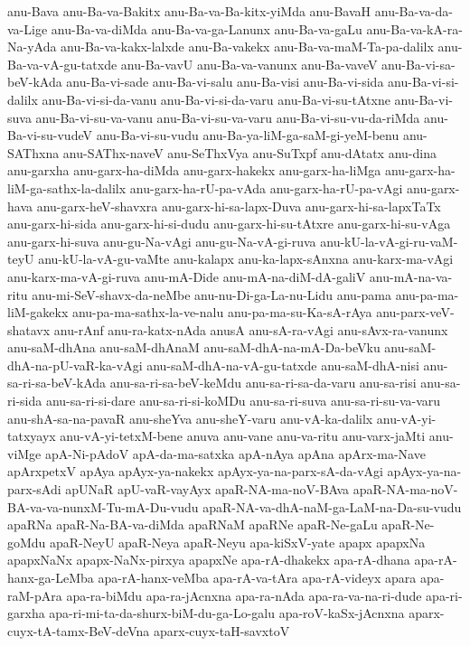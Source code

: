{anu-Bava
anu-Ba-va-Bakitx
anu-Ba-va-Ba-kitx-yiMda
anu-BavaH
anu-Ba-va-da-va-Lige
anu-Ba-va-diMda
anu-Ba-va-ga-Lanunx
anu-Ba-va-gaLu
anu-Ba-va-kA-ra-Na-yAda
anu-Ba-va-kakx-lalxde
anu-Ba-vakekx
anu-Ba-va-maM-Ta-pa-dalilx
anu-Ba-va-vA-gu-tatxde
anu-Ba-vavU
anu-Ba-va-vanunx
anu-Ba-vaveV
anu-Ba-vi-sa-beV-kAda
anu-Ba-vi-sade
anu-Ba-vi-salu
anu-Ba-visi
anu-Ba-vi-sida
anu-Ba-vi-si-dalilx
anu-Ba-vi-si-da-vanu
anu-Ba-vi-si-da-varu
anu-Ba-vi-su-tAtxne
anu-Ba-vi-suva
anu-Ba-vi-su-va-vanu
anu-Ba-vi-su-va-varu
anu-Ba-vi-su-vu-da-riMda
anu-Ba-vi-su-vudeV
anu-Ba-vi-su-vudu
anu-Ba-ya-liM-ga-saM-gi-yeM-benu
anu-SAThxna
anu-SAThx-naveV
anu-SeThxVya
anu-SuTxpf
anu-dAtatx
anu-dina
anu-garxha
anu-garx-ha-diMda
anu-garx-hakekx
anu-garx-ha-liMga
anu-garx-ha-liM-ga-sathx-la-dalilx
anu-garx-ha-rU-pa-vAda
anu-garx-ha-rU-pa-vAgi
anu-garx-hava
anu-garx-heV-shavxra
anu-garx-hi-sa-lapx-Duva
anu-garx-hi-sa-lapxTaTx
anu-garx-hi-sida
anu-garx-hi-si-dudu
anu-garx-hi-su-tAtxre
anu-garx-hi-su-vAga
anu-garx-hi-suva
anu-gu-Na-vAgi
anu-gu-Na-vA-gi-ruva
anu-kU-la-vA-gi-ru-vaM-teyU
anu-kU-la-vA-gu-vaMte
anu-kalapx
anu-ka-lapx-sAnxna
anu-karx-ma-vAgi
anu-karx-ma-vA-gi-ruva
anu-mA-Dide
anu-mA-na-diM-dA-galiV
anu-mA-na-va-ritu
anu-mi-SeV-shavx-da-neMbe
anu-nu-Di-ga-La-nu-Lidu
anu-pama
anu-pa-ma-liM-gakekx
anu-pa-ma-sathx-la-ve-nalu
anu-pa-ma-su-Ka-sA-rAya
anu-parx-veV-shatavx
anu-rAnf
anu-ra-katx-nAda
anusA
anu-sA-ra-vAgi
anu-sAvx-ra-vanunx
anu-saM-dhAna
anu-saM-dhAnaM
anu-saM-dhA-na-mA-Da-beVku
anu-saM-dhA-na-pU-vaR-ka-vAgi
anu-saM-dhA-na-vA-gu-tatxde
anu-saM-dhA-nisi
anu-sa-ri-sa-beV-kAda
anu-sa-ri-sa-beV-keMdu
anu-sa-ri-sa-da-varu
anu-sa-risi
anu-sa-ri-sida
anu-sa-ri-si-dare
anu-sa-ri-si-koMDu
anu-sa-ri-suva
anu-sa-ri-su-va-varu
anu-shA-sa-na-pavaR
anu-sheYva
anu-sheY-varu
anu-vA-ka-dalilx
anu-vA-yi-tatxyayx
anu-vA-yi-tetxM-bene
anuva
anu-vane
anu-va-ritu
anu-varx-jaMti
anu-viMge
apA-Ni-pAdoV
apA-da-ma-satxka
apA-nAya
apAna
apArx-ma-Nave
apArxpetxV
apAya
apAyx-ya-nakekx
apAyx-ya-na-parx-sA-da-vAgi
apAyx-ya-na-parx-sAdi
apUNaR
apU-vaR-vayAyx
apaR-NA-ma-noV-BAva
apaR-NA-ma-noV-BA-va-va-nunxM-Tu-mA-Du-vudu
apaR-NA-va-dhA-naM-ga-LaM-na-Da-su-vudu
apaRNa
apaR-Na-BA-va-diMda
apaRNaM
apaRNe
apaR-Ne-gaLu
apaR-Ne-goMdu
apaR-NeyU
apaR-Neya
apaR-Neyu
apa-kiSxV-yate
apapx
apapxNa
apapxNaNx
apapx-NaNx-pirxya
apapxNe
apa-rA-dhakekx
apa-rA-dhana
apa-rA-hanx-ga-LeMba
apa-rA-hanx-veMba
apa-rA-va-tAra
apa-rA-videyx
apara
apa-raM-pAra
apa-ra-biMdu
apa-ra-jAcnxna
apa-ra-nAda
apa-ra-va-na-ri-dude
apa-ri-garxha
apa-ri-mi-ta-da-shurx-biM-du-ga-Lo-galu
apa-roV-kaSx-jAcnxna
aparx-cuyx-tA-tamx-BeV-deVna
aparx-cuyx-taH-savxtoV
}

